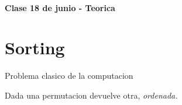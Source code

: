 \documentclass[a4paper,10pt]{article}
\begin{document}
\paragraph*{Clase 18 de junio - Teorica}
\section*{Sorting}
Problema clasico de la computacion

Dada una permutacion devuelve otra, \emph{ordenada.}
\end{document}
